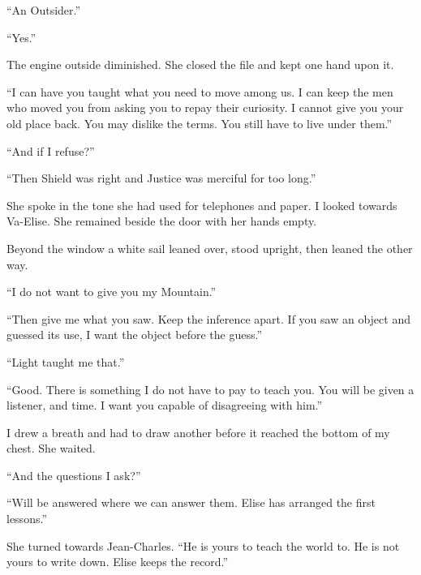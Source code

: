 ``An Outsider.''\par

``Yes.''\par

The engine outside diminished. She closed the file and kept one hand upon it.\par

``I can have you taught what you need to move among us. I can keep the men who moved you from asking you to repay their curiosity. I cannot give you your old place back. You may dislike the terms. You still have to live under them.''\par

``And if I refuse?''\par

``Then Shield was right and Justice was merciful for too long.''\par

She spoke in the tone she had used for telephones and paper. I looked towards Va-Elise. She remained beside the door with her hands empty.\par

Beyond the window a white sail leaned over, stood upright, then leaned the other way.\par

``I do not want to give you my Mountain.''\par

``Then give me what you saw. Keep the inference apart. If you saw an object and guessed its use, I want the object before the guess.''\par

``Light taught me that.''\par

``Good. There is something I do not have to pay to teach you. You will be given a listener, and time. I want you capable of disagreeing with him.''\par

I drew a breath and had to draw another before it reached the bottom of my chest. She waited.\par

``And the questions I ask?''\par

``Will be answered where we can answer them. Elise has arranged the first lessons.''\par

She turned towards Jean-Charles. ``He is yours to teach the world to. He is not yours to write down. Elise keeps the record.''\par

